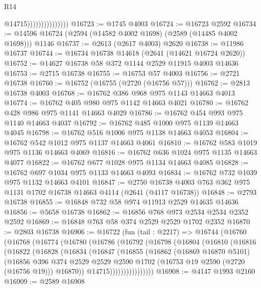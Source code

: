 \begin{lexlean}{R14}
\begin{coremodule}
                                  @14715)))))))))))))))
@16723 := @1745 @4003
@16724 := @16723 @2592
@16734 := @14596 @16724 (@2594 (@14582 @4002 @1698) (@2589 (@14485 @4002 @1698))) @1146
@16737 := @2613 (@2617 @4003) @2620
@16738 := @11986 @16737
@16744 := @16734 @16738 @14618 (@2641 (@14621 @16724 @2620))
@16752 := @14627 @16738 @58 @372 @1144 @2529 @11915 @4003 @14636
@16753 := @2715 @16738
@16755 := @16753 @57 @4003
@16756 := @2721 @16738
@16760 := @16752 (@16755 (@2720 (@16756 @57)))
@16762 := @2813 @16738 @4003
@16768 := @16762 @386 @968 @975 @1143 @14663 @4013
@16774 := @16762 @405 @980 @975 @1142 @14663 @4021
@16780 := @16762 @428 @986 @975 @1141 @14663 @4029
@16786 := @16762 @454 @993 @975 @1140 @14663 @4037
@16792 := @16762 @485 @1000 @975 @1139 @14663 @4045
@16798 := @16762 @516 @1006 @975 @1138 @14663 @4053
@16804 := @16762 @542 @1012 @975 @1137 @14663 @4061
@16810 := @16762 @583 @1019 @975 @1136 @14663 @4069
@16816 := @16762 @636 @1024 @975 @1135 @14663 @4077
@16822 := @16762 @677 @1028 @975 @1134 @14663 @4085
@16828 := @16762 @697 @1034 @975 @1133 @14663 @4093
@16834 := @16762 @732 @1039 @975 @1132 @14663 @4101
@16847 := @2750 @16738 @4003 @763 @362 @975 @1131 @1702 @16738 @14663 @4114 (@2641 (@4117 @16738))
@16848 := @2793 @16738
@16855 := @16848 @732 @58 @974 @11913 @2529 @14635 @14636
@16856 := @5658 @16738
@16862 := @16856 @768 @973 @2534 @2534 @2352 @2592
@16869 := @16848 @763 @58 @374 @2529 @2529 @1702 @2352
@16870 := @2803 @16738
@16906 := @16722
    (fun (tail : @2217) =>
    @16744
      (@16760
        (@16768
          (@16774
            (@16780
              (@16786
                (@16792
                  (@16798
                    (@16804
                      (@16810
                        (@16816
                          (@16822
                            (@16828
                              (@16834
                                (@16847
                                  (@16855
                                    (@16862
                                      (@16869 @16870 @5101)
                                      (@16856
                                        @396
                                        @374
                                        @2529
                                        @2529
                                        @2590
                                        @1702
                                        (@16753 @19 @2590 (@2720 (@16756 @19)))
                                        @16870))
                                    @14715))))))))))))))))
@16908 := @4147 @1993 @2160
@16909 := @2589 @16908

\end{coremodule}
\end{lexlean}
